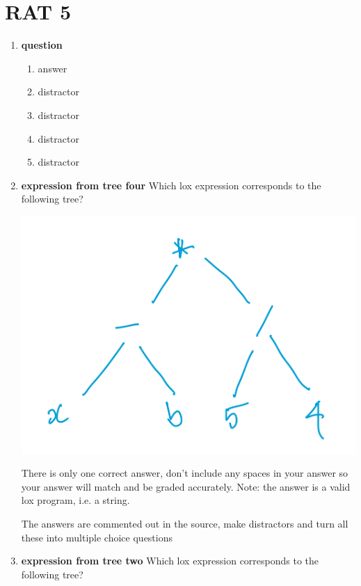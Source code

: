 \documentclass[twoside=false, DIV=14]{scrartcl}
\begin{document}
\part*{RAT 5}
\renewcommand{\labelenumii}{\alph{enumii}) $\square$}
\begin{enumerate}
\item \textbf{question}
\begin{enumerate}
  \item answer \tick
  \item distractor
  \item distractor
  \item distractor
  \item distractor
\end{enumerate}
  \item \textbf{expression from tree four}
  Which lox expression corresponds to the following tree?
  
  \includegraphics[width=\textwidth]{expr_tree_four.jpeg}
  
  There is only one correct answer, don't include any spaces in your answer so your answer will match and be graded accurately.  Note: the answer is a valid lox program, i.e. a string.%
  \begin{todo}
  The answers are commented out in the source, make distractors and turn all these into multiple choice questions
  \end{todo}

  \item \textbf{expression from tree two}
  Which lox expression corresponds to the following tree? 
  

\end{enumerate}
\end{document}
